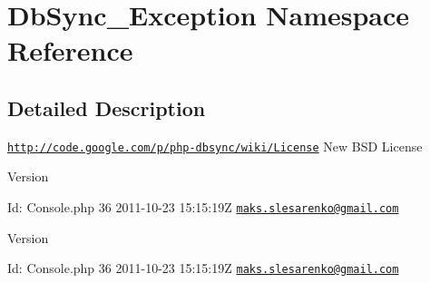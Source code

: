 \hypertarget{namespaceDbSync__Exception}{
\section{DbSync\_\-Exception Namespace Reference}
\label{namespaceDbSync__Exception}
}


\subsection{Detailed Description}
\href{http://code.google.com/p/php-dbsync/wiki/License}{\tt http://code.google.com/p/php-\/dbsync/wiki/License} New BSD License \begin{DoxyVersion}{Version}

\end{DoxyVersion}
\begin{DoxyParagraph}{Id:}
Console.php 36 2011-\/10-\/23 15:15:19Z \href{mailto:maks.slesarenko@gmail.com}{\tt maks.slesarenko@gmail.com} 
\end{DoxyParagraph}


\begin{DoxyVersion}{Version}

\end{DoxyVersion}
\begin{DoxyParagraph}{Id:}
Console.php 36 2011-\/10-\/23 15:15:19Z \href{mailto:maks.slesarenko@gmail.com}{\tt maks.slesarenko@gmail.com} 
\end{DoxyParagraph}
